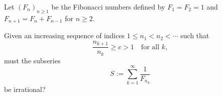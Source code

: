 Let $(F_n)_{n\ge 1}$ be the Fibonacci numbers defined by $F_1=F_2=1$ and $F_{n+1}=F_n+F_{n-1}$ for $n\ge 2$.

Given an increasing sequence of indices $1\le n_1<n_2<\cdots$ such that
\[
\frac{n_{k+1}}{n_k}\ge c>1\quad\text{for all }k,
\]
must the subseries
\[
S:=\sum_{k=1}^{\infty}\frac{1}{F_{n_k}}
\]
be irrational?
